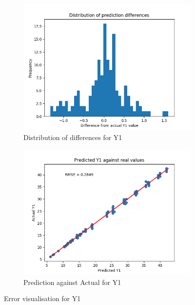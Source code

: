 \documentclass[12pt]{article}
\begin{document}
\begin{figure}[!ht]
\centering
\begin{subfigure}{.5\textwidth}
  \centering
  \includegraphics[width=\linewidth]{images/Y1errordist}
  \caption{Distribution of differences for Y1}
  \label{fig:y1diffdist}
\end{subfigure}%
\begin{subfigure}{.5\textwidth}
  \centering
  \includegraphics[width=\linewidth]{images/Y1scatter}
  \caption{Prediction against Actual for Y1}
  \label{fig:y1diffscatter}
\end{subfigure}
\caption{Error visualisation for Y1}
\label{fig:y1error}
\end{figure}
\end{document}
